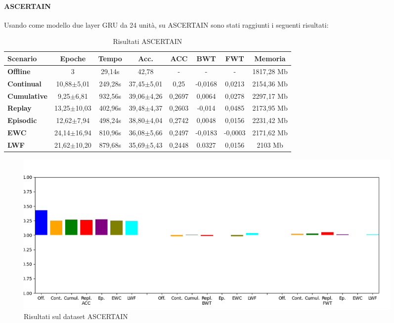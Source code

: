 \paragraph{ASCERTAIN} Usando come modello due layer GRU da 24 unità, su ASCERTAIN sono stati raggiunti i seguenti risultati:
\begin{table}[h]
\footnotesize
    \begin{tabular}{l|c|c|c|c|c|c|c}
        \textbf{Scenario} & \textbf{Epoche} & \textbf{Tempo} & \textbf{Acc.} & \textbf{ACC} & \textbf{BWT} & \textbf{FWT} & \textbf{Memoria}\\
        \hline
         \textbf{Offline} & 3 & 29,14s & 42,78 & - & - & - & 1817,28 Mb\\
        \textbf{Continual} & 10,88$\pm$5,01 & 249,28s & 37,45$\pm$5,01 & 0,25 & -0,0168 & 0,0213 & 2154,36 Mb\\
        \textbf{Cumulative} & 9,25$\pm$6,81 & 932,56s & 39,06$\pm$4,26 & 0,2697 & 0,0064 & 0,0278 & 2297,17 Mb\\
        \textbf{Replay} & 13,25$\pm$10,03 & 402,96s & 39,48$\pm$4,37 & 0,2603 & -0,014 & 0,0485 & 2173,95 Mb\\
        \textbf{Episodic} & 12,62$\pm$7,94 & 498,24s & 38,80$\pm$4,04 & 0,2742 & 0,0048 & 0,0156 & 2231,42 Mb\\
        \textbf{EWC} & 24,14$\pm$16,94 & 810,96s & 36,08$\pm$5,66 & 0,2497 & -0,0183 & -0,0003 & 2171,62 Mb\\
        \textbf{LWF} & 21,62$\pm$10,20 & 879,68s & 35,69$\pm$5,43 & 0,2448 & 0.0327 & 0,0156 & 2103 Mb\\
    \end{tabular}
    \caption{Risultati ASCERTAIN}
    \label{tab:resascertain}
\end{table}
\begin{figure}[h]
	\begin{center}
		\includegraphics[width=0.95\textwidth]{img/graphs/ascertain_final_metrics.png}
		\caption{Risultati sul dataset ASCERTAIN}
		\label{fig:ascertain_metrics_graph}
	\end{center}
\end{figure}

